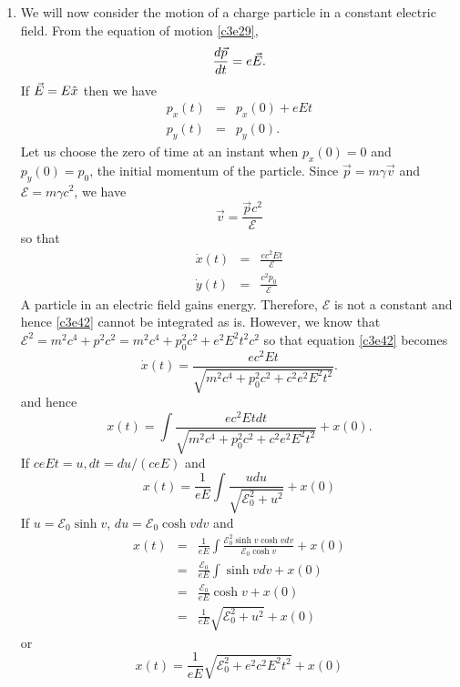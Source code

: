 \begin{enumerate}
\item We will now consider the motion of a charge particle in a constant 
electric field. From the equation of motion \eqref{c3e29},
\begin{equation}\label{c3e38}
\frac{d{\vec{p}}}{d{t}} = e\vec{E}.
\end{equation}
If $\vec{E} = E\hat{x}$ then we have
\begin{eqnarray}
p_x(t) &=& p_x(0) + eEt \label{c3e39} \\
p_y(t) &=& p_y(0) \label{c3e40}.
\end{eqnarray}
Let us choose the zero of time at an instant when $p_x(0)=0$ and $p_y(0)=p_0$,
the initial momentum of the particle. Since $\vec{p} = m\gamma\vec{v}$ and 
$\mathcal{E} = m\gamma c^2$, we have 
\begin{equation}\label{c3e41}
\vec{v} = \frac{\vec{p}c^2}{\mathcal{E}}
\end{equation}
so that
\begin{eqnarray}
\dot{x}(t) &=& \frac{ec^2Et}{\mathcal{E}} \label{c3e42} \\
\dot{y}(t) &=& \frac{c^2p_0}{\mathcal{E}} \label{c3e43}
\end{eqnarray}
A particle in an electric field gains energy. Therefore, $\mathcal{E}$ is not a
constant and hence \eqref{c3e42} cannot be integrated as is. However, we know 
that $\mathcal{E}^2 = m^2c^4 + p^2c^2 = m^2c^4 + p_0^2c^2 + e^2E^2t^2c^2$ so 
that equation \eqref{c3e42} becomes
\begin{equation}\label{c3e44}
\dot{x}(t) = \frac{ec^2Et}{\sqrt{m^2c^4 + p_0^2c^2 + c^2e^2E^2t^2}}.
\end{equation}
and hence
\[
x(t) = \int \frac{ec^2Et dt}{\sqrt{m^2c^4 + p_0^2c^2 + c^2e^2E^2t^2}} + x(0).
\]
If $ceEt = u, dt = du/(ceE)$ and
\[
x(t) = \frac{1}{eE}\int\frac{u du}{\sqrt{\mathcal{E}_0^2 + u^2}} + x(0)
\]
If $u = \mathcal{E}_0\sinh v$, $du = \mathcal{E}_0\cosh  vdv$ and
\begin{eqnarray*}
x(t) &=& 
 \frac{1}{eE}\int\frac{\mathcal{E}_0^2\sinh v\cosh v dv}
 	{\mathcal{E}_0\cosh v} + x(0) \\
 &=& \frac{\mathcal{E}_0}{eE}\int\sinh v dv + x(0) \\
 &=& \frac{\mathcal{E}_0}{eE}\cosh v + x(0) \\
 &=& \frac{1}{eE}\sqrt{\mathcal{E}_0^2 + u^2} + x(0)
\end{eqnarray*}
or
\begin{equation}\label{c3e45}
x(t) = \frac{1}{eE}\sqrt{\mathcal{E}_0^2 + e^2c^2E^2t^2} + x(0)
\end{equation}

\end{enumerate}
